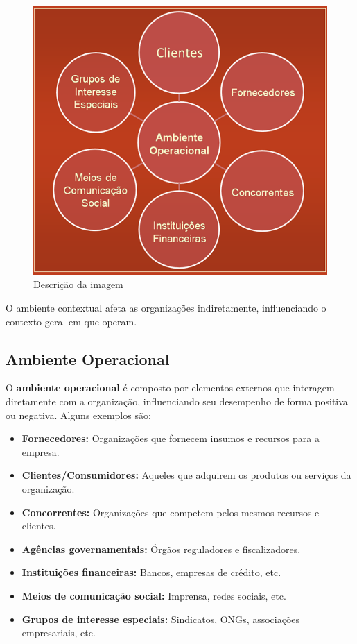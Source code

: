 \begin{figure}[H]  %
    \centering
    \begin{minipage}{0.5\textwidth}
        \centering
        \includegraphics[width=\textwidth]{img/imagem4.png}
        \caption{Descrição da imagem}
        \label{fig:exemplo}
    \end{minipage}
\end{figure}


O ambiente contextual afeta as organizações indiretamente, influenciando o contexto geral em que operam.

\subsection{Ambiente Operacional}

O \textbf{ambiente operacional} é composto por elementos externos que interagem diretamente com a organização, influenciando seu desempenho de forma positiva ou negativa. Alguns exemplos são:

\begin{itemize}
    \item \textbf{Fornecedores:} Organizações que fornecem insumos e recursos para a empresa.
    \item \textbf{Clientes/Consumidores:} Aqueles que adquirem os produtos ou serviços da organização.
    \item \textbf{Concorrentes:} Organizações que competem pelos mesmos recursos e clientes.
    \item \textbf{Agências governamentais:} Órgãos reguladores e fiscalizadores.
    \item \textbf{Instituições financeiras:} Bancos, empresas de crédito, etc.
    \item \textbf{Meios de comunicação social:} Imprensa, redes sociais, etc.
    \item \textbf{Grupos de interesse especiais:} Sindicatos, ONGs, associações empresariais, etc.
\end{itemize}


